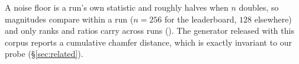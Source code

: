 A noise floor is a run's own statistic and roughly halves when $n$ doubles, so magnitudes
compare within a run ($n{=}256$ for the leaderboard, $128$ elsewhere) and only ranks and
ratios carry across runs (). The generator released with this
corpus \citep{chen2019voxelcnn} reports a cumulative chamfer distance,
which is exactly invariant to our probe (\S\ref{sec:related}).
